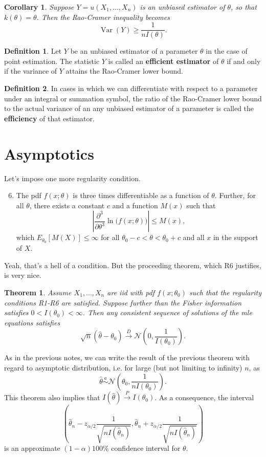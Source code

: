 \documentclass[12pt]{article}
\newcommand{\thetahat}{\hat{\theta}}
\newcommand{\asim}{\overset{a}{\sim}}
\newcommand{\abs}[1]{\left\vert{#1}\right\vert}
\newcommand{\normal}[2]{\mathcal{N} \left({#1}, {#2} \right)}
\newcommand{\cprob}{\overset{P}{\rightarrow}}
\newcommand{\cdist}{\overset{D}{\rightarrow}}
\renewcommand{\hat}[1]{\widehat{#1}}
\DeclareMathOperator*{\Var}{Var}
\newtheorem{theorem}{Theorem}
\newtheorem{corollary}{Corollary}
\theoremstyle{definition}
\newtheorem{definition}{Definition}
\begin{document}
\begin{corollary}
	Suppose $Y=u(X_1, \hdots, X_n)$ is an unbiased estimator of $\theta$, so that $k(\theta)=\theta$. Then the Rao-Cramer inequality becomes
		\[	\Var(Y) \geq \frac{1}{nI(\theta)}.	\]
\end{corollary}

\begin{definition}
	Let $Y$ be an unbiased estimator of a parameter $\theta$ in the case of point estimation. The statistic $Y$ is called an \textbf{efficient estimator} of $\theta$ if and only if the variance of $Y$ attains the Rao-Cramer lower bound. 
\end{definition}

\begin{definition}
	In cases in which we can differentiate with respect to a parameter under an integral or summation symbol, the ratio of the Rao-Cramer lower bound to the actual variance of an any unbiased estimator of a parameter is called the \textbf{efficiency} of that estimator.
\end{definition}




\section{Asymptotics}

Let's impose one more regularity condition.
\begin{enumerate}[label=\textbf{(R\arabic*)}]
	\setcounter{enumi}{5}
	\item The pdf $f(x;\theta)$ is three times differentiable as a function of $\theta$. Further, for all $\theta$, there exists a constant $c$ and a function $M(x)$ such that
		\[	\abs{ \frac{\partial^3}{\partial \theta^3} \ln\big( f(x;\theta)\big)} \leq M(x),\]	
	which $E_{\theta_0}[M(X)] \leq \infty$ for all $\theta_0 - c < \theta < \theta_0 + c$ and all $x$ in the support of $X$. 
\end{enumerate}
Yeah, that's a hell of a condition. But the proceeding theorem, which R6 justifies, is very nice. 

\begin{theorem}
	Assume $X_1, \hdots, X_n$ are iid with pdf $f(x;\theta_0)$ such that the regularity conditions R1-R6 are satisfied. Suppose further than the Fisher information satisfies $0 < I(\theta_0) < \infty$. Then any consistent sequence of solutions of the mle equations satisfies
		\[	\sqrt{n}(\thetahat - \theta_0) \cdist \normal{0}{\frac{1}{I(\theta_0)}}.	\]
\end{theorem}
As in the previous notes, we can write the result of the previous theorem with regard to asymptotic distribution, i.e. for large (but not limiting to infinity) $n$, as
		\[	\thetahat  \asim \normal{\theta_0}{\frac{1}{nI(\theta_0)}}.	\]
This theorem also implies that $I(\thetahat) \cprob I(\theta_0)$. As a consequence, the interval
	\[ \left( \thetahat_n - z_{\alpha/2} \frac{1}{\sqrt{nI(\thetahat_n)}},  \thetahat_n + z_{\alpha/2} \frac{1}{\sqrt{nI(\thetahat_n)}} \right )	\]
is an approximate $(1 - \alpha)100\%$ confidence interval for $\theta$. 
\end{document}
